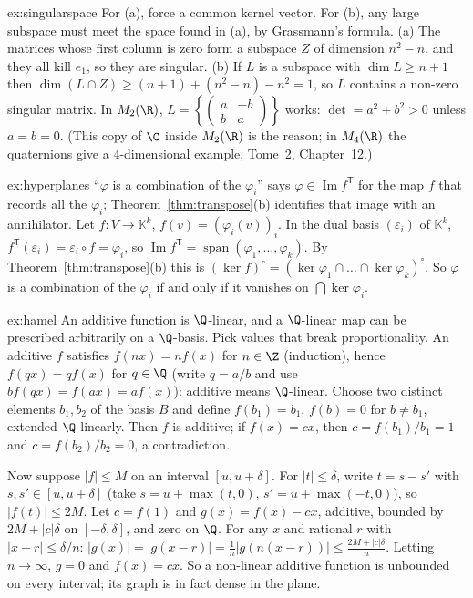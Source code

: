 \begin{solution}{ex:singularspace}
\idea For (a), force a common kernel vector. For (b), any large subspace must meet the space found in (a), by
Grassmann's formula.
\writeup (a) The matrices whose first column is zero form a subspace $Z$ of dimension $n^2-n$, and they all kill $e_1$,
so they are singular. (b) If $L$ is a subspace with $\dim L\ge n+1$ then $\dim(L\cap Z)\ge(n+1)+(n^2-n)-n^2=1$, so $L$
contains a non-zero singular matrix. In $M_2(\R)$, $L=\left\{\begin{pmatrix}a&-b\\b&a\end{pmatrix}\right\}$ works:
$\det=a^2+b^2>0$ unless $a=b=0$. (This copy of $\C$ inside $M_2(\R)$ is the reason; in $M_4(\R)$ the quaternions give a
$4$-dimensional example, Tome~2, Chapter~12.)
\end{solution}

\begin{solution}{ex:hyperplanes}
\idea ``$\varphi$ is a combination of the $\varphi_i$'' says $\varphi\in\operatorname{Im}f^{\mathsf T}$ for the map $f$ that
records all the $\varphi_i$; Theorem~\ref{thm:transpose}(b) identifies that image with an annihilator.
\writeup Let $f:V\to\mathbb K^k$, $f(v)=(\varphi_i(v))_i$. In the dual basis $(\varepsilon_i)$ of $\mathbb K^k$,
$f^{\mathsf T}(\varepsilon_i)=\varepsilon_i\circ f=\varphi_i$, so $\operatorname{Im}f^{\mathsf T}=\operatorname{span}(\varphi_1,\dots,\varphi_k)$.
By Theorem~\ref{thm:transpose}(b) this is $(\ker f)^\circ=(\ker\varphi_1\cap\dots\cap\ker\varphi_k)^\circ$. So $\varphi$ is a
combination of the $\varphi_i$ if and only if it vanishes on $\bigcap\ker\varphi_i$.
\end{solution}

\begin{solution}{ex:hamel}
\idea An additive function is $\Q$-linear, and a $\Q$-linear map can be prescribed arbitrarily on a $\Q$-basis. Pick
values that break proportionality.
\writeup An additive $f$ satisfies $f(nx)=nf(x)$ for $n\in\Z$ (induction), hence $f(qx)=qf(x)$ for $q\in\Q$ (write
$q=a/b$ and use $bf(qx)=f(ax)=af(x)$): additive means $\Q$-linear. Choose two distinct elements $b_1,b_2$ of the basis $B$
and define $f(b_1)=b_1$, $f(b)=0$ for $b\ne b_1$, extended $\Q$-linearly. Then $f$ is additive; if $f(x)=cx$, then
$c=f(b_1)/b_1=1$ and $c=f(b_2)/b_2=0$, a contradiction.

Now suppose $|f|\le M$ on an interval $[u,u+\delta]$. For $|t|\le\delta$, write $t=s-s'$ with $s,s'\in[u,u+\delta]$
(take $s=u+\max(t,0)$, $s'=u+\max(-t,0)$), so $|f(t)|\le2M$. Let $c=f(1)$ and $g(x)=f(x)-cx$, additive, bounded by
$2M+|c|\delta$ on $[-\delta,\delta]$, and zero on $\Q$. For any $x$ and rational $r$ with $|x-r|\le\delta/n$:
$|g(x)|=|g(x-r)|=\frac1n|g(n(x-r))|\le\frac{2M+|c|\delta}n$. Letting $n\to\infty$, $g=0$ and $f(x)=cx$. So a non-linear
additive function is unbounded on every interval; its graph is in fact dense in the plane.
\end{solution}

